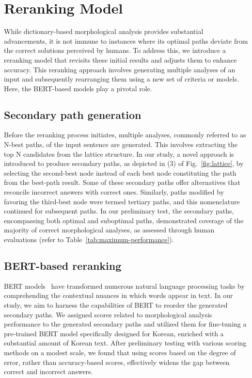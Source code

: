 \documentclass[AMS,STIX2COL]{WileyNJD-v2}
\begin{document}
    \section{Reranking Model}\label{sec:reranking-model}

    While dictionary-based morphological analysis provides substantial advancements, it is not immune to instances where its optimal paths deviate from the correct solutions perceived by humans.
    To address this, we introduce a reranking model that revisits these initial results and adjusts them to enhance accuracy.
    This reranking approach involves generating multiple analyses of an input and subsequently rearranging them using a new set of criteria or models.
    Here, the BERT-based models play a pivotal role.

    \subsection{Secondary path generation}\label{subsec:secondary-path-generation}

    Before the reranking process initiates, multiple analyses, commonly referred to as N-best paths, of the input sentence are generated.
    This involves extracting the top N candidates from the lattice structure.
    In our study, a novel approach is introduced to produce secondary paths, as depicted in (3) of Fig.~\ref{fig:lattice}, by selecting the second-best node instead of each best node constituting the path from the best-path result.
    Some of these secondary paths offer alternatives that reconcile incorrect answers with correct ones.
    Similarly, paths modified by favoring the third-best node were termed tertiary paths, and this nomenclature continued for subsequent paths.
    In our preliminary test, the secondary paths, encompassing both optimal and suboptimal paths, demonstrated coverage of the majority of correct morphological analyses, as assessed through human evaluations (refer to Table~\ref{tab:maximum-performance}).

    \subsection{BERT-based reranking}\label{subsec:bert-based-reranking}

    BERT models~\cite{Devlin2019} have transformed numerous natural language processing tasks by comprehending the contextual nuances in which words appear in text.
    In our study, we aim to harness the capabilities of BERT to reorder the generated secondary paths.
    We assigned scores related to morphological analysis performance to the generated secondary paths and utilized them for fine-tuning a pre-trained BERT model specifically designed for Korean, enriched with a substantial amount of Korean text.
    After preliminary testing with various scoring methods on a modest scale, we found that using scores based on the degree of error, rather than accuracy-based scores, effectively widens the gap between correct and incorrect answers.
\end{document}

